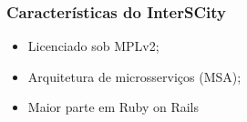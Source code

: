 \begin{frame}
    \frametitle{Características do InterSCity}
    \begin{itemize}
        \item Licenciado sob MPLv2;
        \item Arquitetura de microsserviços (MSA);
        \item Maior parte em Ruby on Rails
    \end{itemize}
\end{frame}
